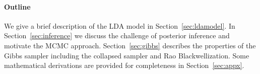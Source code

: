 \documentclass{article}%
\theoremstyle{definition}
\begin{document}
\paragraph{Outline} We give a brief description of the LDA model in Section~\ref{sec:ldamodel}. In Section~\ref{sec:inference} we discuss the challenge of posterior inference and motivate the MCMC approach. Section~\ref{sec:gibbs} describes the properties of the Gibbs sampler including the collapsed sampler and Rao Blackwellization. Some mathematical derivations are provided for completeness in Section~\ref{sec:appx}.


\end{document}
